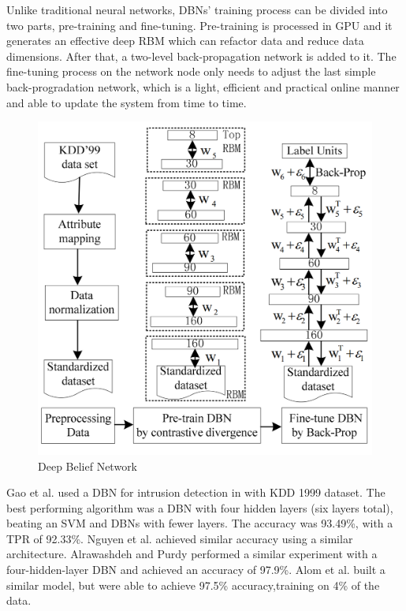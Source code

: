 \documentclass[conference]{IEEEtran}
\begin{document}
Unlike traditional neural networks, DBNs' training process can be divided into two parts, pre-training and fine-tuning. Pre-training is processed in GPU and it generates an effective deep RBM which can refactor data and reduce data dimensions. After that, a two-level back-propagation network is added to it. The fine-tuning process on the network node only needs to adjust the last simple back-progradation network, which is a light, efficient and practical online manner and able to update the system from time to time.

\begin{figure}[ht]
\centering
\includegraphics[scale=0.56]{pictures/DBN.PNG}
\caption{Deep Belief Network}
\label{fig:dbn}
\end{figure}


Gao et al. used a DBN for intrusion detection in \cite{gao2014intrusion} with KDD 1999 dataset. The best performing algorithm was a DBN with four hidden layers (six layers total), beating an SVM and DBNs with fewer layers. The accuracy was 93.49\%, with a TPR of 92.33\%. Nguyen et al. \cite{nguyen2018cyberattack} achieved similar accuracy using a similar architecture. Alrawashdeh and Purdy \cite{alrawashdeh2016toward} performed a similar experiment with a four-hidden-layer DBN and achieved an accuracy of 97.9\%. Alom et al. \cite{alom2015intrusion} built a similar model, but were able to achieve 97.5\% accuracy,training on 4\% of the data.
\end{document}
